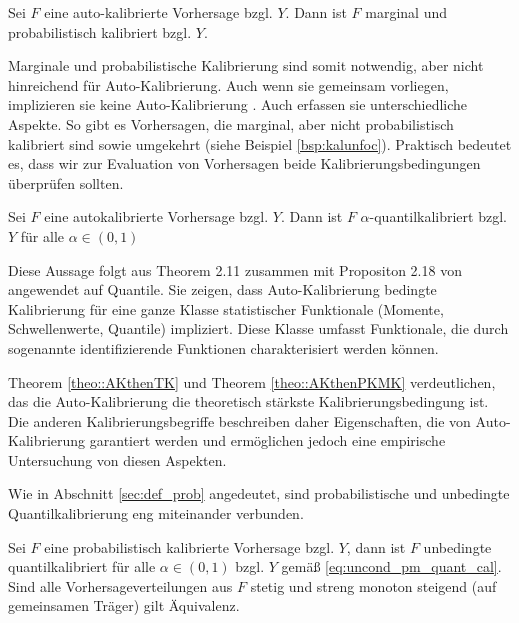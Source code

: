 \begin{theo} \label{theo::AKthenPKMK}
Sei $F$ eine auto-kalibrierte Vorhersage bzgl. $Y$. Dann ist $F$ marginal und probabilistisch kalibriert bzgl. $Y$.
\end{theo}{}

Marginale und probabilistische Kalibrierung sind somit notwendig, aber nicht hinreichend für Auto-Kalibrierung. Auch wenn sie gemeinsam vorliegen, implizieren sie keine Auto-Kalibrierung \parencite[Example 2.4]{gneiting2023regression}.  Auch erfassen sie unterschiedliche Aspekte. So gibt es Vorhersagen, die marginal, aber nicht probabilistisch kalibriert sind sowie umgekehrt (siehe Beispiel \ref{bsp:kalunfoc}). Praktisch bedeutet es, dass wir zur Evaluation von Vorhersagen beide Kalibrierungsbedingungen überprüfen sollten.

\begin{theo} \label{theo::AKthenTK}
Sei $F$ eine autokalibrierte Vorhersage bzgl. $Y$. Dann ist $F$ $\alpha$-quantilkalibriert bzgl. $Y$ für alle $\alpha \in (0,1)$
\end{theo}{}

Diese Aussage folgt aus Theorem 2.11 zusammen mit Propositon 2.18  von \textcite{gneiting2023regression} angewendet auf Quantile. Sie zeigen, dass Auto-Kalibrierung bedingte Kalibrierung für eine ganze Klasse statistischer Funktionale (Momente, Schwellenwerte, Quantile) impliziert.  Diese Klasse umfasst Funktionale, die durch sogenannte identifizierende Funktionen charakterisiert werden können.

Theorem \ref{theo::AKthenTK} und Theorem \ref{theo::AKthenPKMK} verdeutlichen, das die Auto-Kalibrierung die theoretisch stärkste Kalibrierungsbedingung ist. Die anderen Kalibrierungsbegriffe beschreiben daher Eigenschaften, die von Auto-Kalibrierung garantiert werden und ermöglichen jedoch eine empirische Untersuchung von diesen Aspekten.

Wie in Abschnitt \ref{sec:def_prob} angedeutet, sind probabilistische und unbedingte Quantilkalibrierung eng miteinander verbunden.

\begin{theo}\label{theo:pK-unbQK}
Sei $F$ eine probabilistisch kalibrierte Vorhersage bzgl. $Y$, dann ist $F$ unbedingte quantilkalibriert für alle $\alpha \in (0,1)$ bzgl. $Y$ gemäß \eqref{eq:uncond_pm_quant_cal}.\\
Sind alle Vorhersageverteilungen aus $F$ stetig und streng monoton steigend (auf gemeinsamen Träger) gilt Äquivalenz.
\end{theo}{}

